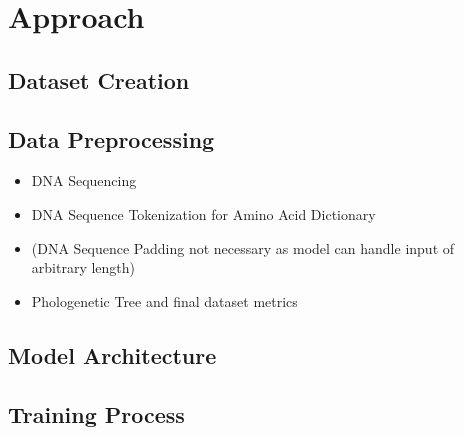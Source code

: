 \section{Approach}  \label{approach}

\subsection{Dataset Creation}  \label{ch:approachA}

\subsection{Data Preprocessing}  \label{ch:approachB}

\begin{itemize}
	\item DNA Sequencing
	\item DNA Sequence Tokenization for Amino Acid Dictionary
	\item (DNA Sequence Padding not necessary as model can handle input of arbitrary length)
	\item Phologenetic Tree and final dataset metrics
\end{itemize}

\subsection{Model Architecture}  \label{ch:approachC}




\subsection{Training Process} \label{ch:approachD}


\newpage
